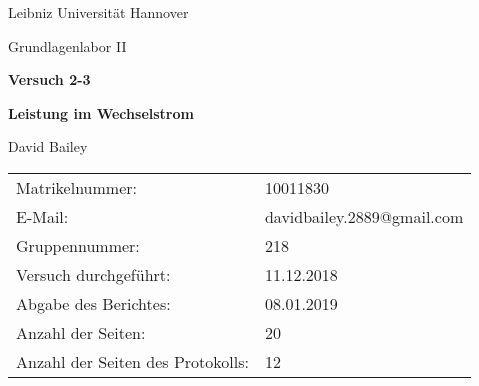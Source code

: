 \begin{titlepage}
	\centering
	{Leibniz Universität Hannover\par}
	{\large Grundlagenlabor II\par}	

	\vspace{4.5cm}	
	
	{\huge \bf Versuch 2-3 \par}
	{\Huge \bf Leistung im Wechselstrom\par}
	\vspace{0.3cm}
	
	\vspace{1.5cm}
	
	{\Large David Bailey\par}

	\vfill

	\raggedright

{\Large
\begin{tabular}{ll}
Matrikelnummer:& 10011830 \\
E-Mail: & davidbailey.2889@gmail.com \\
Gruppennummer:& 218 \\
Versuch durchgeführt:& 11.12.2018 \\
Abgabe des Berichtes:& 08.01.2019 \\
Anzahl der Seiten:& 20 \\
Anzahl der Seiten des Protokolls:& 12
\end{tabular}\par}

\end{titlepage}
